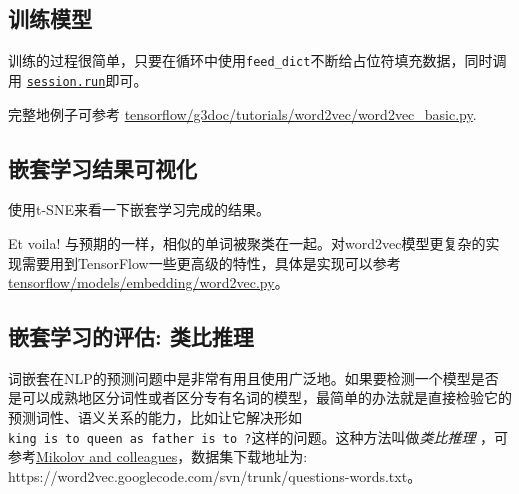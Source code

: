 \subsection{训练模型 }\label{ux8badux7ec3ux6a21ux578b}

训练的过程很简单，只要在循环中使用\texttt{feed\_dict}不断给占位符填充数据，同时调用
\href{tensorflow-zh/SOURCE/api_docs/python/client.md\#Session.run}{\texttt{session.run}}即可。

\begin{Shaded}
\begin{Highlighting}[]
  
  \OperatorTok{=} 
  \OperatorTok{=} \OperatorTok{=}
\end{Highlighting}
\end{Shaded}

完整地例子可参考
\href{./word2vec_basic.py}{tensorflow/g3doc/tutorials/word2vec/word2vec\_basic.py}.

\subsection{嵌套学习结果可视化
}\label{ux5d4cux5957ux5b66ux4e60ux7ed3ux679cux53efux89c6ux5316}

使用t-SNE来看一下嵌套学习完成的结果。

Et voila!
与预期的一样，相似的单词被聚类在一起。对word2vec模型更复杂的实现需要用到TensorFlow一些更高级的特性，具体是实现可以参考
\href{https://tensorflow.googlesource.com/tensorflow/+/master/tensorflow/models/embedding/word2vec.py}{tensorflow/models/embedding/word2vec.py}。

\subsection{嵌套学习的评估: 类比推理
}\label{ux5d4cux5957ux5b66ux4e60ux7684ux8bc4ux4f30-ux7c7bux6bd4ux63a8ux7406}

词嵌套在NLP的预测问题中是非常有用且使用广泛地。如果要检测一个模型是否是可以成熟地区分词性或者区分专有名词的模型，最简单的办法就是直接检验它的预测词性、语义关系的能力，比如让它解决形如\texttt{king\ is\ to\ queen\ as\ father\ is\ to\ ?}这样的问题。这种方法叫做\emph{类比推理}
，可参考\href{http://msr-waypoint.com/en-us/um/people/gzweig/Pubs/NAACL2013Regularities.pdf}{Mikolov
and colleagues}，数据集下载地址为:
https://word2vec.googlecode.com/svn/trunk/questions-words.txt。


